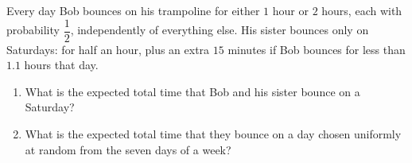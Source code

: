 Every day Bob bounces on his trampoline for either $1$ hour or $2$ hours, each with probability $\dfrac12$, independently of everything else. His sister bounces only on Saturdays: for half an hour, plus an extra $15$ minutes if Bob bounces for less than $1.1$ hours that day.
\begin{enumerate}
\item[(a)] What is the expected total time that Bob and his sister bounce on a Saturday?
\item[(b)] What is the expected total time that they bounce on a day chosen uniformly at random from the seven days of a week?
\end{enumerate}
